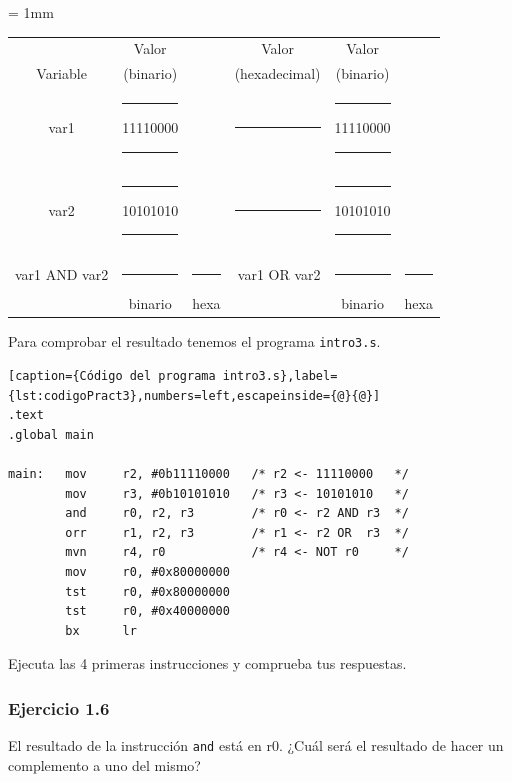 \begin{center}
\small
\colorbox[gray]{0.9}{
\tabcolsep = 1mm
\begin{tabular}{cccccc}
         & Valor     & & Valor         & Valor     & \\
Variable & (binario) & & (hexadecimal) & (binario) & \\
var1 &
\colorbox[gray]{1}{\rule{0.3cm}{0cm}\rule{0cm}{0.46cm}11110000\rule{0.3cm}{0cm}}
& &
\colorbox[gray]{1}{\rule{2cm}{0cm}\rule{0cm}{0.46cm}} &
\colorbox[gray]{1}{\rule{0.3cm}{0cm}\rule{0cm}{0.46cm}11110000\rule{0.3cm}{0cm}}
& \\[1mm]
var2 &
\colorbox[gray]{1}{\rule{0.3cm}{0cm}\rule{0cm}{0.46cm}10101010\rule{0.3cm}{0cm}}
& &
\colorbox[gray]{1}{\rule{2cm}{0cm}\rule{0cm}{0.46cm}} &
\colorbox[gray]{1}{\rule{0.3cm}{0cm}\rule{0cm}{0.46cm}10101010\rule{0.3cm}{0cm}}
& \\[1mm]
\cline{2-3}\cline{5-6}\\[-3mm]
\multicolumn{1}{r}{var1 AND var2} &
\colorbox[gray]{1}{\rule{2cm}{0cm}\rule{0cm}{0.46cm}} &
\colorbox[gray]{1}{\rule{1cm}{0cm}\rule{0cm}{0.46cm}} &
\multicolumn{1}{r}{var1 OR var2} &
\colorbox[gray]{1}{\rule{2cm}{0cm}\rule{0cm}{0.46cm}} &
\colorbox[gray]{1}{\rule{1cm}{0cm}\rule{0cm}{0.46cm}} \\
& binario & hexa & & binario & hexa \\
\end{tabular}
}
\end{center}

Para comprobar el resultado tenemos el programa {\tt intro3.s}.

\begin{lstlisting}[caption={Código del programa intro3.s},label={lst:codigoPract3},numbers=left,escapeinside={@}{@}]
.text
.global main
 
main:   mov     r2, #0b11110000   /* r2 <- 11110000   */
        mov     r3, #0b10101010   /* r3 <- 10101010   */
        and     r0, r2, r3        /* r0 <- r2 AND r3  */
        orr     r1, r2, r3        /* r1 <- r2 OR  r3  */
        mvn     r4, r0            /* r4 <- NOT r0     */
        mov     r0, #0x80000000
        tst     r0, #0x80000000
        tst     r0, #0x40000000
        bx      lr
\end{lstlisting}

Ejecuta las 4 primeras instrucciones y comprueba tus respuestas.

\subsubsection{Ejercicio 1.6}
El resultado de la instrucción {\tt and} está en r0. ¿Cuál será el resultado
de hacer un complemento a uno del mismo?

